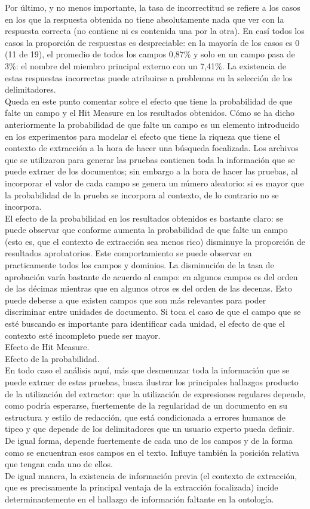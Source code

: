 Por último, y no menos importante, la tasa de incorrectitud se refiere a los casos en los que la respuesta obtenida no tiene absolutamente nada que ver con la respuesta correcta (no contiene ni es contenida una por la otra). En casí todos los casos la proporción de respuestas es despreciable: en la mayoría de los casos es 0 (11 de 19),  el promedio de todos los campos 0,87\% y solo en un campo pasa de 3\%: el nombre del miembro principal externo con un 7,41\%. La existencia de estas respuestas incorrectas puede atribuirse a problemas en la selección de los delimitadores. \\

Queda en este punto comentar sobre el efecto que tiene la probabilidad de que falte un campo y el Hit Measure en los resultados obtenidos. Cómo se ha dicho anteriormente la probabilidad de que falte un campo es un elemento introducido en los experimentos para modelar el efecto que tiene la riqueza que tiene el contexto de extracción a la hora de hacer una búsqueda focalizada. Los archivos que se utilizaron para generar las pruebas contienen toda la información que se puede extraer de los documentos; sin embargo a la hora de hacer las pruebas, al incorporar el valor de cada campo se genera un número aleatorio: si es mayor que la probabilidad de la prueba se incorpora al contexto, de lo contrario no se incorpora. \\

El efecto de la probabilidad en los resultados obtenidos es bastante claro: se puede observar que conforme aumenta la probabilidad de que falte un campo (esto es, que el contexto de extracción sea menos rico) disminuye la proporción de resultados aprobatorios. Este comportamiento se puede observar en practicamente todos los campos y dominios. La disminución de la tasa de aprobación varía bastante de acuerdo al campo: en algunos campos es del orden de las décimas mientras que en algunos otros es del orden de las decenas. Esto puede deberse a que existen campos que son más relevantes para poder discriminar entre unidades de documento. Si toca el caso de que el campo que se esté buscando es importante para identificar cada unidad, el efecto de que el contexto esté incompleto puede ser mayor. \\

Efecto de Hit Measure. \\

Efecto de la probabilidad. \\

En todo caso el análisis aquí, más que desmenuzar toda la información que se puede extraer de estas pruebas, busca ilustrar los principales hallazgos producto de la utilización del extractor: que la utilización de expresiones regulares depende, como podría esperarse, fuertemente de la regularidad de un documento en su estructura y estilo de redacción, que está condicionada a errores humanos de tipeo y que depende de los delimitadores que un usuario experto pueda definir. De igual forma, depende fuertemente de cada uno de los campos y de la forma como se encuentran esos campos en el texto. Influye también la posición relativa que tengan cada uno de ellos.\\

De igual manera, la existencia de información previa (el contexto de extracción, que es precisamente la principal ventaja de la extracción focalizada) incide determinantemente en el hallazgo de información faltante en la ontología.\\
